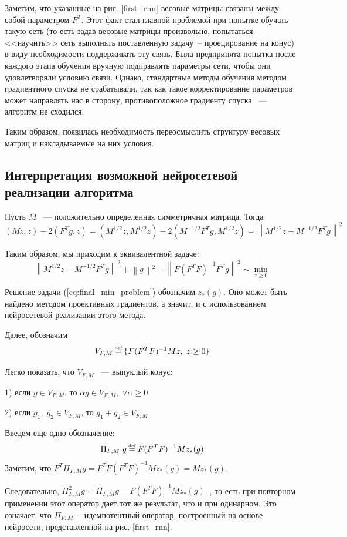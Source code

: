 \documentclass[a4paper, 12pt]{article}
\newcommand{\norm}[1]{\left\|#1\right\|}
\newcommand\myeq{\mathrel{\stackrel{\makebox[0pt]{\mbox{\normalfont\tiny def}}}{=}}}
\begin{document}
Заметим, что указанные на рис. \ref{first_rnn} весовые матрицы связаны между собой параметром $F^T$. Этот факт стал главной проблемой при попытке обучать такую сеть (то есть задав весовые матрицы произвольно, попытаться <<научить>> сеть выполнять поставленную задачу~-- проецирование на конус) в виду необходимости поддерживать эту связь. Была предпринята попытка после каждого этапа обучения вручную подправлять параметры сети, чтобы они удовлетворяли условию связи. Однако, стандартные методы обучения методом градиентного спуска не срабатывали, так как такое корректирование параметров может направлять нас в сторону, противоположное градиенту спуска ~--- алгоритм не сходился.

Таким образом, появилась необходимость переосмыслить структуру весовых матриц и накладываемые на них условия.
  
\subsection{Интерпретация возможной нейросетевой реализации алгоритма}

Пусть $M$ ~--- положительно определенная симметричная матрица. Тогда $$(M z, z) - 2 (F^T g, z) = (M^{1/2} z, M^{1/2} z) - 2 (M^{-1/2} F^T g, M^{1/2} z) = \norm{M^{1/2} z - M^{-1/2} F^T g}^2$$

Таким образом, мы приходим к эквивалентной задаче: 
\begin{equation}\label{eq:final_min_problem}
\norm{M^{1/2} z - M^{-1/2} F^T g}^2 + \norm{g}^2 - \norm{F (F^T F)^{-1} F^T g}^2 \sim \min\limits_{z \geq 0}
\end{equation}

Решение задачи (\ref{eq:final_min_problem}) обозначим $z_*(g)$. Оно может быть найдено методом проективных градиентов, а значит, и с использованием нейросетевой реализации этого метода.

Далее, обозначим 
$$V_{F, M} \myeq \{F (F^T F)^{-1} M z,\;z \geq 0\}$$

Легко показать, что  $V_{F, M}$ ~--- выпуклый конус:

1) если $g \in V_{F, M}$, \;то $\alpha g \in V_{F, M}, \; \forall \alpha \geq 0$  

2) если $g_1,\;g_2 \in V_{F, M}$, то $g_1 + g_2 \in V_{F, M}$

Введем еще одно обозначение: $$\Pi_{F,M} \; g \myeq F (F^T F)^{-1} M z_*(g)$$
Заметим, что $F^T \Pi_{F, M} g = F^T F (F^T F)^{-1} M z_*(g) = M z_*(g)$.

Следовательно, $\Pi_{F, M}^2 g = \Pi_{F, M} g = F (F^T F)^{-1} M z_*(g) \;\;$, то есть при повторном применении этот оператор дает тот же результат, что и при одинарном. Это означает, что $\Pi_{F, M}$~-- идемпотентный оператор, построенный на основе нейросети, представленной на рис. \ref{first_rnn}.
\end{document}
